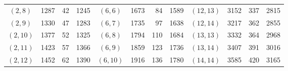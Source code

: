 \documentclass[11pt,a4paper]{article}
\theoremstyle{remark}
\begin{document}
\begin{center}
\begin{tabular}{crrr@{\quad}crrr@{\quad}crrr}
$(2,8)$ & 1287 & 42 & 1245 & $(6,6)$ & 1673 & 84 & 1589 & $(12,13)$ & 3152 & 337 & 2815 \\
$(2,9)$ & 1330 & 47 & 1283 & $(6,7)$ & 1735 & 97 & 1638 & $(12,14)$ & 3217 & 362 & 2855 \\
$(2,10)$ & 1377 & 52 & 1325 & $(6,8)$ & 1794 & 110 & 1684 & $(13,13)$ & 3332 & 364 & 2968 \\
$(2,11)$ & 1423 & 57 & 1366 & $(6,9)$ & 1859 & 123 & 1736 & $(13,14)$ & 3407 & 391 & 3016 \\
$(2,12)$ & 1452 & 62 & 1390 & $(6,10)$ & 1916 & 136 & 1780 & $(14,14)$ & 3585 & 420 & 3165 \\
\bottomrule
\end{tabular}
\end{center}
\end{document}
